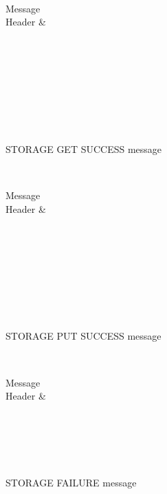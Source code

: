 \documentclass[a4paper, 11pt]{article}
\begin{document}
\begin{figure}[h!]
	\centering
	\begin{bytefield}[bitwidth=0.8em]{32}
		 \\
		\begin{rightwordgroup}{Message \\  Header}
			 & 
		\end{rightwordgroup} \\
		 \\
		\skippedwords \\
		 \\
		 \\
		\skippedwords \\
		 \\
	\end{bytefield}
	\caption{STORAGE GET SUCCESS message}
	\label{STORAGEGETSUCCESS}
\end{figure}

\begin{figure}[h!]
	\centering
	\begin{bytefield}[bitwidth=0.8em]{32}
		 \\
		\begin{rightwordgroup}{Message \\  Header}
			 & 
		\end{rightwordgroup} \\
		 \\
		\skippedwords \\
		 \\
		 \\
		\skippedwords \\
		 \\
	\end{bytefield}
	\caption{STORAGE PUT SUCCESS message}
	\label{STORAGEPUTSUCCESS}
\end{figure}

\begin{figure}[h!]
	\centering
	\begin{bytefield}[bitwidth=0.8em]{32}
		 \\
		\begin{rightwordgroup}{Message \\  Header}
			 & 
		\end{rightwordgroup} \\
		 \\
		\skippedwords \\
		 \\
	\end{bytefield}
	\caption{STORAGE FAILURE message}
	\label{STORAGEFAILURE}
\end{figure}
\end{document}
